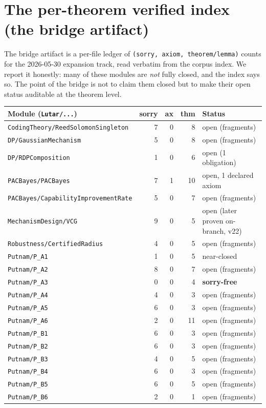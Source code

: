 \documentclass[11pt]{article}
\theoremstyle{plain}
\theoremstyle{definition}
\theoremstyle{remark}
\begin{document}
\section{The per-theorem verified index (the bridge artifact)}
\label{sec:delta}

The bridge artifact is a per-file ledger of \texttt{(sorry, axiom, theorem/lemma)}
counts for the 2026-05-30 expansion track, read verbatim from the corpus index. We
report it honestly: many of these modules are \emph{not} fully closed, and the index
says so. The point of the bridge is not to claim them closed but to make their open
status auditable at the theorem level.

\begin{longtable}{@{}p{}rrrl@{}}
\toprule
\textbf{Module (\texttt{Lutar/...})} & \textbf{sorry} & \textbf{ax} & \textbf{thm} & \textbf{Status} \\
\midrule
\endhead
\texttt{CodingTheory/ReedSolomonSingleton} & 7 & 0 & 8 & open (fragments) \\
\texttt{DP/GaussianMechanism}              & 5 & 0 & 8 & open (fragments) \\
\texttt{DP/RDPComposition}                 & 1 & 0 & 6 & open (1 obligation) \\
\texttt{PACBayes/PACBayes}                 & 7 & 1 & 10 & open, 1 declared axiom \\
\texttt{PACBayes/CapabilityImprovementRate}& 5 & 0 & 7 & open (fragments) \\
\texttt{MechanismDesign/VCG}               & 9 & 0 & 5 & open (later proven on-branch, v22) \\
\texttt{Robustness/CertifiedRadius}        & 4 & 0 & 5 & open (fragments) \\
\texttt{Putnam/P\_A1}                      & 1 & 0 & 5 & near-closed \\
\texttt{Putnam/P\_A2}                      & 8 & 0 & 7 & open (fragments) \\
\texttt{Putnam/P\_A3}                      & 0 & 0 & 4 & \textbf{sorry-free} \\
\texttt{Putnam/P\_A4}                      & 4 & 0 & 3 & open (fragments) \\
\texttt{Putnam/P\_A5}                      & 6 & 0 & 3 & open (fragments) \\
\texttt{Putnam/P\_A6}                      & 2 & 0 & 11 & open (fragments) \\
\texttt{Putnam/P\_B1}                      & 6 & 0 & 3 & open (fragments) \\
\texttt{Putnam/P\_B2}                      & 6 & 0 & 3 & open (fragments) \\
\texttt{Putnam/P\_B3}                      & 4 & 0 & 5 & open (fragments) \\
\texttt{Putnam/P\_B4}                      & 6 & 0 & 3 & open (fragments) \\
\texttt{Putnam/P\_B5}                      & 6 & 0 & 5 & open (fragments) \\
\texttt{Putnam/P\_B6}                      & 2 & 0 & 1 & open (fragments) \\
\bottomrule
\end{longtable}
\end{document}
